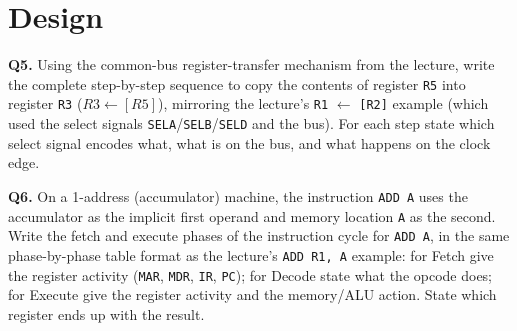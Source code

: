 \documentclass[11pt]{article}
\begin{document}
\section{Design}

\textbf{Q5.} Using the common-bus register-transfer mechanism from the lecture, write the complete step-by-step sequence to copy the contents of register \texttt{R5} into register \texttt{R3} ($R3 \gets [R5]$), mirroring the lecture's \texttt{R1} $\gets$ \texttt{[R2]} example (which used the select signals \texttt{SELA}/\texttt{SELB}/\texttt{SELD} and the bus). For each step state which select signal encodes what, what is on the bus, and what happens on the clock edge.

\textbf{Q6.} On a 1-address (accumulator) machine, the instruction \texttt{ADD A} uses the accumulator as the implicit first operand and memory location \texttt{A} as the second. Write the fetch and execute phases of the instruction cycle for \texttt{ADD A}, in the same phase-by-phase table format as the lecture's \texttt{ADD R1, A} example: for Fetch give the register activity (\texttt{MAR}, \texttt{MDR}, \texttt{IR}, \texttt{PC}); for Decode state what the opcode does; for Execute give the register activity and the memory/ALU action. State which register ends up with the result.
\end{document}
